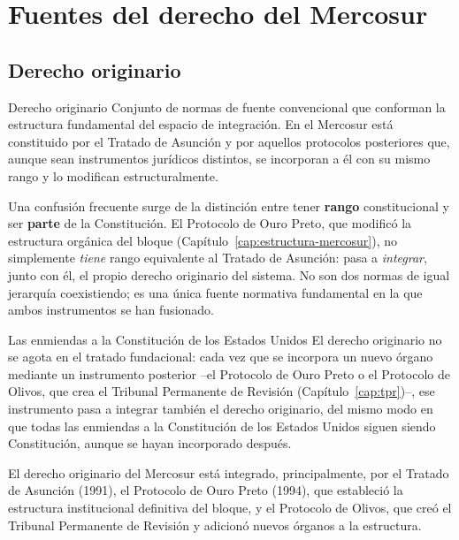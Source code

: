 \documentclass[12pt,oneside]{book}
\renewcommand{\chaptermark}[1]{\markboth{\thechapter.\ #1}{}}
\begin{document}
\chapter{Fuentes del derecho del Mercosur}
\chaptermark{Fuentes del derecho del Mercosur}
\label{cap:fuentes-mercosur}

\section{Derecho originario}

\begin{definicion}{Derecho originario}
Conjunto de normas de fuente convencional que conforman la estructura fundamental del espacio de integración. En el Mercosur está constituido por el Tratado de Asunción y por aquellos protocolos posteriores que, aunque sean instrumentos jurídicos distintos, se incorporan a él con su mismo rango y lo modifican estructuralmente.
\end{definicion}

Una confusión frecuente surge de la distinción entre tener \textbf{rango} constitucional y ser \textbf{parte} de la Constitución. El Protocolo de Ouro Preto, que modificó la estructura orgánica del bloque (Capítulo~\ref{cap:estructura-mercosur}), no simplemente \emph{tiene} rango equivalente al Tratado de Asunción: pasa a \emph{integrar}, junto con él, el propio derecho originario del sistema. No son dos normas de igual jerarquía coexistiendo; es una única fuente normativa fundamental en la que ambos instrumentos se han fusionado.

\begin{ejemplo}{Las enmiendas a la Constitución de los Estados Unidos}
El derecho originario no se agota en el tratado fundacional: cada vez que se incorpora un nuevo órgano mediante un instrumento posterior --el Protocolo de Ouro Preto o el Protocolo de Olivos, que crea el Tribunal Permanente de Revisión (Capítulo~\ref{cap:tpr})--, ese instrumento pasa a integrar también el derecho originario, del mismo modo en que todas las enmiendas a la Constitución de los Estados Unidos siguen siendo Constitución, aunque se hayan incorporado después.
\end{ejemplo}

El derecho originario del Mercosur está integrado, principalmente, por el Tratado de Asunción (1991), el Protocolo de Ouro Preto (1994), que estableció la estructura institucional definitiva del bloque, y el Protocolo de Olivos, que creó el Tribunal Permanente de Revisión y adicionó nuevos órganos a la estructura.
\end{document}

